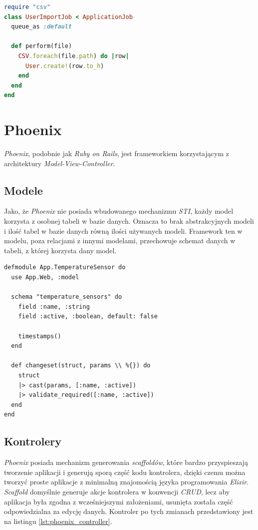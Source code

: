 \begin{lstlisting}[caption={},label={lst:rails_active_job},language=Ruby]
require "csv"
class UserImportJob < ApplicationJob
  queue_as :default

  def perform(file)
    CSV.foreach(file.path) do |row|
      User.create!(row.to_h)
    end
  end
end
\end{lstlisting}

\section{Phoenix}
\emph{Phoenix}, podobnie jak \emph{Ruby on Rails}, jest frameworkiem korzystającym z architektury \emph{Model-View-Controller}.

\subsection{Modele}
Jako, że \emph{Phoenix} nie posiada wbudowanego mechanizmu \emph{STI}, każdy model korzysta z osobnej tabeli w bazie danych. Oznacza to brak abstrakcyjnych modeli i ilość tabel w bazie danych równą ilości używanych modeli. Framework ten w modelu, poza relacjami z innymi modelami, przechowuje schemat danych w tabeli, z której korzysta dany model.

\begin{lstlisting}[caption={Model sensora temperatury we frameworku Phoenix.},label={lst:phoenix_temp_sensor_model}]
defmodule App.TemperatureSensor do
  use App.Web, :model

  schema "temperature_sensors" do
    field :name, :string
    field :active, :boolean, default: false

    timestamps()
  end

  def changeset(struct, params \\ %{}) do
    struct
    |> cast(params, [:name, :active])
    |> validate_required([:name, :active])
  end
end
\end{lstlisting}


\subsection{Kontrolery}
\emph{Phoenix} posiada mechanizm generowania \emph{scaffoldów}, które bardzo przyspieszają tworzenie aplikacji i generują sporą część kodu kontrolera, dzięki czemu można tworzyć proste aplikacje z minimalną znajomością języka programowania \emph{Elixir}. \emph{Scaffold} domyślnie generuje akcje kontrolera w konwencji \emph{CRUD}, lecz aby aplikacja była zgodna z wcześniejszymi założeniami, usunięta została część odpowiedzialna za edycję danych. Kontroler po tych zmianach przedstawiony jest na listingu \ref{lst:phoenix_controller}.

